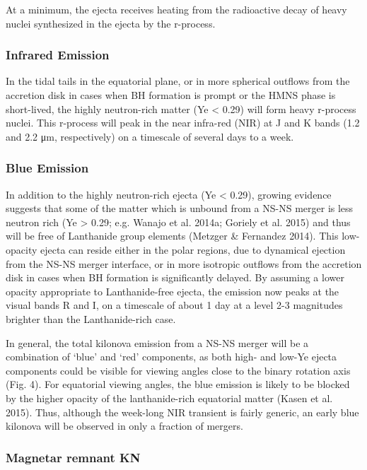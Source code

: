At a minimum, the ejecta receives heating from the radioactive decay of heavy nuclei synthesized in the ejecta by the r-process.



\subsubsection{Infrared Emission}

In the tidal tails in the equatorial plane, or in more spherical outflows from the accretion disk in cases when BH formation is prompt or the HMNS phase is short-lived, the highly neutron-rich matter (Ye < 0.29) will form heavy r-process nuclei.
This r-process will peak in the near infra-red (NIR) at J and K bands (1.2 and 2.2 μm, respectively) on a timescale of several days to a week.

\subsubsection{Blue Emission}

In addition to the highly neutron-rich ejecta (Ye < 0.29), growing evidence suggests that some of the matter which is unbound from a NS-NS merger is less neutron rich (Ye > 0.29; e.g. Wanajo et al. 2014a; Goriely et al. 2015) and thus will be free of Lanthanide group elements (Metzger \& Fernandez 2014). This low-opacity ejecta can reside either in the polar regions, due to dynamical ejection from the NS-NS merger interface, or in more isotropic outflows from the accretion disk in cases when BH formation is significantly delayed.
By assuming a lower opacity appropriate to Lanthanide-free ejecta, the emission now peaks at the visual bands R and I, on a timescale of about 1 day at a level 2-3 magnitudes brighter than the Lanthanide-rich case.

In general, the total kilonova emission from a NS-NS merger will be a combination of `blue' and `red' components, as both high- and low-Ye ejecta components could be visible for viewing angles close to the binary rotation axis (Fig. 4). For equatorial viewing angles, the blue emission is likely to be blocked by the higher opacity of the lanthanide-rich equatorial matter (Kasen et al. 2015). Thus, although the week-long NIR transient is fairly generic, an early blue kilonova will be observed in only a fraction of mergers.

\subsubsection{Magnetar remnant KN}

